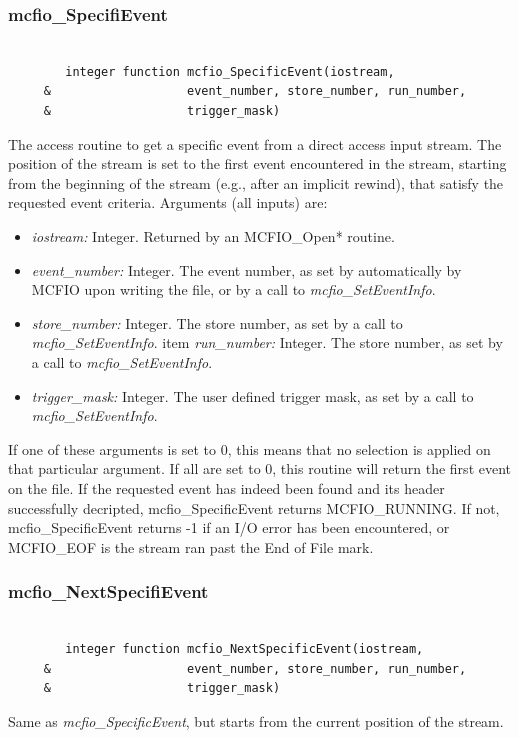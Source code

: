 \subsubsection{mcfio\_SpecifiEvent}

\begin{verbatim}

        integer function mcfio_SpecificEvent(iostream,
     &                   event_number, store_number, run_number,
     &                   trigger_mask)

\end{verbatim}
The access routine to get a specific event from a direct access input stream.
The position of the stream is set to the first event encountered in the stream,
starting from the beginning of the stream (e.g., after an implicit rewind),
that satisfy the requested event criteria. Arguments (all inputs) are:
\begin{itemize}
\item  {\em iostream:} Integer.  Returned by an MCFIO\_Open* routine.
\item {\em event\_number:} Integer. The event number, as set by automatically
by MCFIO upon writing the file, or by a call to {\em  mcfio\_SetEventInfo}.
\item {\em store\_number:} Integer.  The store number, as set
 by a call to {\em  mcfio\_SetEventInfo}.
item {\em run\_number:} Integer. The store number, as set
 by a call to {\em  mcfio\_SetEventInfo}.
\item {\em trigger\_mask:} Integer. The user defined trigger mask, as set
 by a call to {\em  mcfio\_SetEventInfo}.
\end{itemize}

If one of these arguments is set to 0, this means that no selection
is applied on that particular  argument. If all are set to 0, this
routine will return the first event on the file.
If the requested event has indeed been found and its header
successfully decripted, mcfio\_SpecificEvent returns
MCFIO\_RUNNING.  If not, mcfio\_SpecificEvent returns -1 if an I/O error has
been encountered, or MCFIO\_EOF is the stream ran past the
End of File mark.

\subsubsection{mcfio\_NextSpecifiEvent}

\begin{verbatim}

        integer function mcfio_NextSpecificEvent(iostream,
     &                   event_number, store_number, run_number,
     &                   trigger_mask)

\end{verbatim}
Same as {\em mcfio\_SpecificEvent}, but starts from the current
position of the stream.

